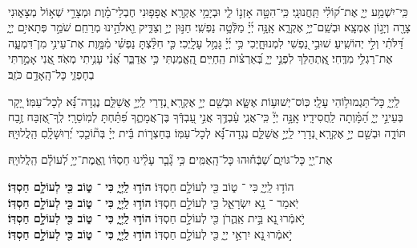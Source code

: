 \documentclass[twoside, openany, parskip=half, 11pt]{book}
\begin{document}
{\\
 
 כִּֽי־יִשְׁמַ֥ע יְיָ֑ אֶת־ק֝וֹלִ֗י תַּֽחֲנוּנָֽי׃ 
כִּֽי־הִטָּ֣ה אָזְנ֣וֹ לִ֑י וּבְיָמַ֥י אֶקְרָֽא׃ 
אֲפָפ֤וּנִי חֶבְלֵי־מָ֗וֶת וּמְצָרֵ֣י שְׁא֣וֹל מְצָא֑וּנִי צָרָ֖ה וְיָג֣וֹן אֶמְצָֽא׃ 
וּבְשֵֽׁם־יְיָ֥ אֶקְרָ֑א אָֽנָּ֥ה יְ֜יָ֗ מַלְּֿטָ֥ה נַפְשִֽׁי׃ 
חַנּ֣וּן יְיָ֣ וְצַדִּ֑יק וֵ֖אלֹהֵ֣ינוּ מְרַחֵֽם׃ 
שֹׁמֵ֣ר פְּתָאיִ֣ם יְיָ֑ דַּ֝לֹּתִ֗י וְלִ֣י יְהוֹשִֽׁיעַ׃ 
שׁוּבִ֣י נַ֭פְשִׁי לִמְנוּחָ֑יְכִי כִּ֥י יְ֜יָ֗ גָּמַ֥ל עָלָֽיְכִי׃ 
כִּ֤י חִלַּ֨צְתָּ נַפְשִׁ֗י מִ֫מָּ֥וֶת אֶת־עֵינִ֥י מִן־דִּמְעָ֑ה אֶת־רַגְלִ֥י מִדֶּֽחִי׃ 
 אֶֽ֭תְהַלֵּךְ לִפְנֵ֣י יְיָ֑ בְּ֝אַרְצ֗וֹת הַֽחַיִּֽים׃ 
הֶֽ֭אֱמַנְתִּי כִּ֥י אֲדַבֵּ֑ר אֲ֝נִ֗י עָנִ֥יתִי מְאֹֽד׃ 
אֲ֭נִי אָמַ֣רְתִּי בְחָפְזִ֑י כָּל־הָֽאָדָ֥ם כֹּזֵֽב׃


 
 לַֽיְיָ֑ כָּל־תַּגְמוּל֥וֹהִי עָלָֽי׃ 
כּֽוֹס־יְשׁוּע֥וֹת אֶשָּׂ֑א וּבְשֵׁ֖ם יְיָ֣ אֶקְרָֽא׃ 
נְ֭דָרַי לַֽיְיָ֣ אֲשַׁלֵּ֑ם נֶגְדָה־נָּ֝֗א לְכָל־עַמּֽוֹ׃ 
יָ֭קָר בְּעֵינֵ֣י יְיָ֑ הַ֝מָּ֗וְתָה לַֽחֲסִידָֽיו׃ 
אָֽנָּ֣ה יְיָ֘ כִּֽי־אֲנִ֢י עַ֫בְדֶּ֥ךָ אֲנִ֣י עַ֭בְדְּֿךָ בֶּן־אֲמָתֶ֑ךָ פִּ֝תַּ֗חְתָּ לְמֽוֹסֵרָֽי׃ 
 לְֽךָ־אֶ֭זְבַּח זֶ֥בַח תּוֹדָ֑ה וּבְשֵׁ֖ם יְיָ֣ אֶקְרָֽא׃ 
נְ֭דָרַי לַֽיְיָ֣ אֲשַׁלֵּ֑ם נֶגְדָה־נָּ֝֗א לְכָל־עַמּֽוֹ׃ 
בְּחַצְר֤וֹת בֵּ֬ית יְיָ֗ בְּת֘וֹכֵ֤כִי יְ֝רֽוּשָׁלָֽ֗םִ הַֽלֲלוּיָֽהּ׃

  אֶת־יְ֖יָ כָּל־גּוֹיִ֑ם שַׁ֝בְּֿח֗וּהוּ כָּל־הָֽאֻמִּֽים׃ כִּ֥י גָ֘בַ֤ר עָלֵ֨ינוּ חַסְדּ֗וֹ וֶֽאֱמֶת־יְיָ֥ לְ֝עוֹלָ֗ם הַֽלֲלוּיָֽהּ׃

\shatz הוֹד֣וּ לַֽיְיָ֑ כִּי ־ ט֑וֹב כִּ֖י לְעוֹלָ֣ם חַסְדּֽוֹ׃\hfill \break {}
 \kahal \textbf{הוֹד֣וּ לַֽיְיָ֑ כִּי ־ ט֑וֹב כִּ֖י לְעוֹלָ֣ם חַסְדּֽוֹ׃}  \\
\shatz  יֹֽאמַר ־ נָ֥א יִשְׂרָאֵ֑ל כִּ֖י לְעוֹלָ֣ם חַסְדּֽוֹ׃\hfill \break
 \kahal  \textbf{הוֹד֣וּ לַֽיְיָ֑ כִּי ־ ט֑וֹב כִּ֖י לְעוֹלָ֣ם חַסְדּֽוֹ׃}  \\
\shatz יֹ֣אמְֿרוּ ֖נָא בֵּ֣ית אַֽהֲ֑רֹן כִּ֖י לְעוֹלָ֣ם חַסְדּֽוֹ׃\hfill \break
\kahal  \textbf{הוֹד֣וּ לַֽיְיָ֑ כִּי ־ ט֑וֹב כִּ֖י לְעוֹלָ֣ם חַסְדּֽוֹ׃}  \\
\shatz יֹ֣אמְֿרוּ ֖נָא יִרְאֵ֣י יְיָ֑ כִּ֖י לְעוֹלָ֣ם חַסְדּֽוֹ׃\hfill \break
 \kahal  \textbf{הוֹד֣וּ לַֽיְיָ֑ כִּי ־ ט֑וֹב כִּ֖י לְעוֹלָ֣ם חַסְדּֽוֹ׃} 

}
\end{document}
